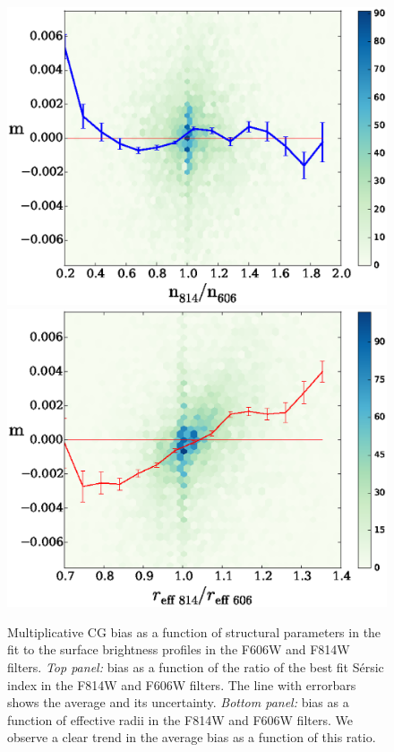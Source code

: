 \documentclass[useAMS,usenatbib]{mnras}
\begin{document}
\begin{figure}
\includegraphics[width=\hsize]{zcgbheat-ne29.eps}
\includegraphics[width=\hsize]{zcgbheat-re29.eps}
\caption{Multiplicative CG bias as a function of structural parameters in the fit to the surface brightness
profiles in the F606W and F814W filters. {\it Top panel:} bias as a function
of the ratio of the best fit S{\'e}rsic index in the F814W and F606W filters. The line with
errorbars shows the average and its uncertainty. {\it Bottom panel:} bias as a function of effective
radii in the F814W and F606W filters. We observe a clear trend in the average bias as a function of
this ratio.}
\label{fig:cg2fitpar}
\end{figure}
\end{document}

